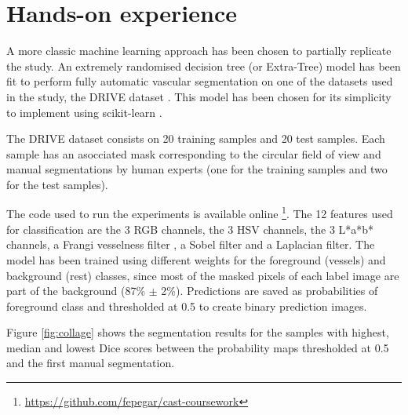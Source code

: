 \section{Hands-on experience}



A more classic machine learning approach has been chosen to partially replicate the study. An extremely randomised decision tree (or Extra-Tree) \cite{geurts_extremely_2006} model has been fit to perform fully automatic vascular segmentation on one of the datasets used in the study, the DRIVE dataset \cite{staal_ridge-based_2004}. This model has been chosen for its simplicity to implement using scikit-learn \cite{pedregosa_scikit-learn:_2011}.



The DRIVE dataset consists on 20 training samples and 20 test samples. Each sample has an asocciated mask corresponding to the circular field of view and manual segmentations by human experts (one for the training samples and two for the test samples).

The code used to run the experiments is available online \footnote{\href{https://github.com/fepegar/cast-coursework}{https://github.com/fepegar/cast-coursework}}. The 12 features used for classification are the 3 RGB channels, the 3 HSV channels, the 3 L*a*b* channels, a Frangi vesselness filter \cite{frangi_multiscale_1998}, a Sobel filter and a Laplacian filter. The model has been trained using different weights for the foreground (vessels) and background (rest) classes, since most of the masked pixels of each label image are part of the background (87\% $\pm$ 2\%). Predictions are saved as probabilities of foreground class and thresholded at 0.5 to create binary prediction images.



Figure \ref{fig:collage} shows the segmentation results for the samples with highest, median and lowest Dice scores between the probability maps thresholded at 0.5 and the first manual segmentation.

